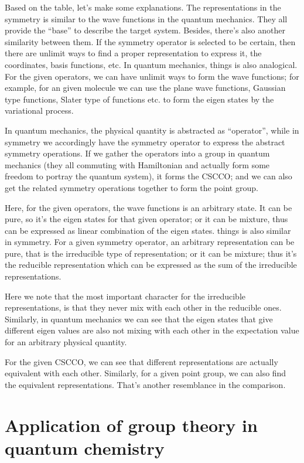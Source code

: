 Based on the table, let's make some explanations. The representations
in the symmetry is similar to the wave functions in the quantum
mechanics. They all provide the ``base'' to describe the target
system. Besides, there's also another similarity between them. If the
symmetry operator is selected to be certain, then there are unlimit
ways to find a proper representation to express it, the coordinates,
basis functions, etc. In quantum mechanics, things is also
analogical. For the given operators, we can have unlimit ways to form
the wave functions; for example, for an given molecule we can use the
plane wave functions, Gaussian type functions, Slater type of
functions etc. to form the eigen states by the variational process.

In quantum mechanics, the physical quantity is abstracted as
``operator'', while in symmetry we accordingly have the symmetry
operator to express the abstract symmetry operations. If we gather the
operators into a group in quantum mechanics (they all commuting with
Hamiltonian and actually form some freedom to portray the quantum
system), it forms the CSCCO; and we can also get the related symmetry
operations together to form the point group.

Here, for the given operators, the wave functions is an arbitrary
state. It can be pure, so it's the eigen states for that given
operator; or it can be mixture, thus can be expressed as linear
combination of the eigen states. things is also similar in symmetry.
For a given symmetry operator, an arbitrary representation can be
pure, that is the irreducible type of representation; or it can be
mixture; thus it's the reducible representation which can be expressed
as the sum of the irreducible representations.

Here we note that the most important character for the irreducible
representations, is that they never mix with each other in the
reducible ones. Similarly, in quantum mechanics we can see that the
eigen states that give different eigen values are also not mixing with
each other in the expectation value for an arbitrary physical
quantity.

For the given CSCCO, we can see that different representations are
actually equivalent with each other. Similarly, for a given point
group, we can also find the equivalent representations. That's another
resemblance in the comparison.

\section{Application of group theory in quantum chemistry}

